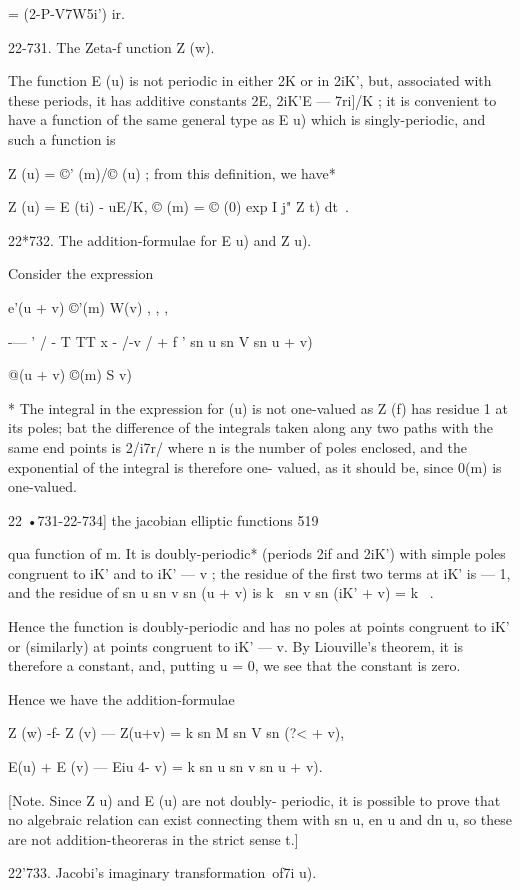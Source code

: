  = (2-P-V7W5i') ir.

22-731. The Zeta-f unction Z (w).

The function E (u) is not periodic in either 2K or in 2iK', but,
associated with these periods, it has additive constants 2E, 2iK'E —
7ri]/K ; it is convenient to have a function of the same general type
as E u) which is singly-periodic, and such a function is

Z (u) = ©' (m)/© (u) ; from this definition, we have*

Z (u) = E (ti) - uE/K, © (m) = © (0) exp I j" Z t) dt\ .

22*732. The addition-formulae for E u) and Z u).

Consider the expression

e'(u + v) ©'(m) W(v) , , ,

-— ' / - T TT x - /-v / + f ' sn u sn V sn u + v)

@(u + v) ©(m) S v)

* The integral in the expression for (u) is not one-valued as Z (f)
has residue 1 at its poles; bat the difference of the integrals taken
along any two paths with the same end points is 2/i7r/ where n is the
number of poles enclosed, and the exponential of the integral is
therefore one- valued, as it should be, since 0(m) is one-valued.



22 •731-22-734] the jacobian elliptic functions 519

qua function of m. It is doubly-periodic* (periods 2if and 2iK') with
simple poles congruent to iK' and to iK' — v ; the residue of the
first two terms at iK' is — 1, and the residue of sn u sn v sn (u + v)
is k~ sn v sn (iK' + v) = k~ .

Hence the function is doubly-periodic and has no poles at points
congruent to iK' or (similarly) at points congruent to iK' — v. By
Liouville's theorem, it is therefore a constant, and, putting u = 0,
we see that the constant is zero.

Hence we have the addition-formulae

Z (w) -f- Z (v) — Z(u+v) = k sn M sn V sn (?< + v),

E(u) + E (v) — Eiu 4- v) = k sn u sn v sn u + v).

[Note. Since Z u) and E (u) are not doubly- periodic, it is possible
to prove that no algebraic relation can exist connecting them with sn
u, en u and dn u, so these are not addition-theoreras in the strict
sense t.]

22'733. Jacobi's imaginary transformation\ of7i u).

